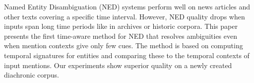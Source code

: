 Named Entity Disambiguation (NED) systems perform well on news articles and other texts covering a specific time interval. However, NED quality drops when inputs span long time periods like in archives or historic corpora. This paper presents the first time-aware method for NED that resolves ambiguities even when mention contexts give only few cues. The method is based on computing temporal signatures for entities and comparing these to the temporal contexts of input mentions. Our experiments show superior quality on a newly created diachronic corpus.

